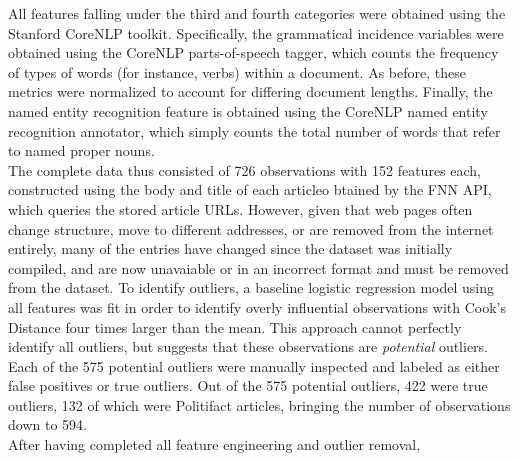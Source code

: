 \documentclass[12pt]{article}
\begin{document}
\hspace*{0.333em}\hspace*{0.333em}\hspace*{0.333em}\hspace*{0.333em}\hspace*{0.333em}All
features falling under the third and fourth categories were obtained
using the Stanford CoreNLP toolkit. Specifically, the grammatical
incidence variables were obtained using the CoreNLP parts-of-speech
tagger, which counts the frequency of types of words (for instance,
verbs) within a document. As before, these metrics were normalized to
account for differing document lengths. Finally, the named entity
recognition feature is obtained using the CoreNLP named entity
recognition annotator, which simply counts the total number of words
that refer to named proper nouns.\\
\hspace*{0.333em}\hspace*{0.333em}\hspace*{0.333em}\hspace*{0.333em}\hspace*{0.333em}The
complete data thus consisted of 726 observations with 152 features each,
constructed using the body and title of each articleo btained by the FNN
API, which queries the stored article URLs. However, given that web
pages often change structure, move to different addresses, or are
removed from the internet entirely, many of the entries have changed
since the dataset was initially compiled, and are now unavaiable or in
an incorrect format and must be removed from the dataset. To identify
outliers, a baseline logistic regression model using all features was
fit in order to identify overly influential observations with Cook's
Distance four times larger than the mean. This approach cannot perfectly
identify all outliers, but suggests that these observations are
\emph{potential} outliers. Each of the 575 potential outliers were
manually inspected and labeled as either false positives or true
outliers. Out of the 575 potential outliers, 422 were true outliers, 132
of which were Politifact articles, bringing the number of observations
down to 594.\\
\hspace*{0.333em}\hspace*{0.333em}\hspace*{0.333em}\hspace*{0.333em}\hspace*{0.333em}After
having completed all feature engineering and outlier removal,
\end{document}
